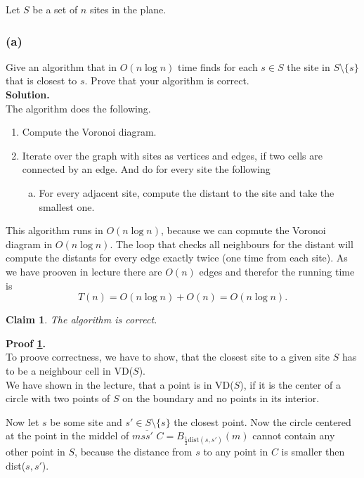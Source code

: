 \documentclass[11pt,a4paper,ngerman]{article}
\newtheorem{lemma}{\bfseries Claim}
\begin{document}
Let $S$ be a set of $n$ sites in the plane.

\subsubsection*{(a)}

Give an algorithm that in $O(n \log n)$ time finds for each $s \in S$ the site in
$S \setminus \{s \}$ that is closest to $s$. Prove that your algorithm is correct.\\

\textbf{Solution.}\\

The algorithm does the following.
\begin{enumerate}
    \item Compute the Voronoi diagram.
    \item Iterate over the graph with sites as vertices and edges, if two cells are connected by an edge.
          And do for every site the following
        \begin{enumerate}[a.]
            \item For every adjacent site, compute the distant to the site and take the smallest one.
        \end{enumerate}
\end{enumerate}

This algorithm runs in $O(n \log n)$, because we can copmute the Voronoi diagram in $O(n \log n)$.
The loop that checks all neighbours for the distant will compute the distants for every edge
exactly twice (one time from each site). As we have prooven in lecture there are $O(n)$ edges
and therefor the running time is
$$ T(n) = O(n \log n) + O(n) = O(n \log n). $$

\begin{lemma} \label{alge:ueb9:t3:cor} The algorithm is correct.
\end{lemma}

\textbf{Proof \ref{alge:ueb9:t3:cor}.}\\
To proove correctness, we have to show, that the closest site to a given site $S$ has to be a neighbour cell
in VD($S$).\\

We have shown in the lecture, that a point is in VD($S$), if it is the center of a circle with two points
of $S$ on the boundary and no points in its interior.

Now let $s$ be some site and $s' \in S \setminus \{ s \}$ the closest point. Now the circle centered at the point
in the middel of $m \overline{ss'}$ $C = B_{\frac{1}{2}\text{dist}(s,s')}(m)$ cannot contain any other point in $S$,
because the distance from $s$ to any point in $C$ is smaller then dist($s,s'$).\\
\end{document}
